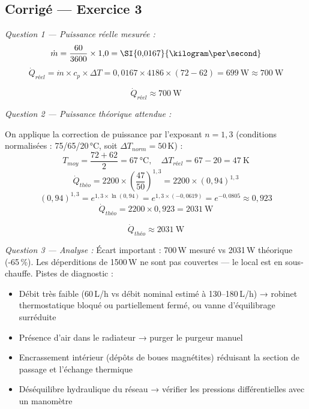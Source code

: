 
\subsection*{Corrigé — Exercice 3}

\textit{Question 1 — Puissance réelle mesurée :}
\[
  \dot{m} = \frac{60}{3600} \times 1{,}0 = \SI{0{,}0167}{\kilogram\per\second}
\]
\[
  \dot{Q}_{réel} = \dot{m} \times c_p \times \Delta T = 0{,}0167 \times 4186 \times (72 - 62) = \SI{699}{\watt} \approx \SI{700}{\watt}
\]

\[
  \boxed{\dot{Q}_{réel} \approx \SI{700}{\watt}}
\]

\textit{Question 2 — Puissance théorique attendue :}

On applique la correction de puissance par l'exposant $n = 1{,}3$ (conditions normalisées : 75/65/20\,°C, soit $\Delta T_{norm} = 50$\,K) :
\[
  T_{moy} = \frac{72 + 62}{2} = \SI{67}{\celsius}, \quad \Delta T_{réel} = 67 - 20 = \SI{47}{\kelvin}
\]
\[
  \dot{Q}_{théo} = 2200 \times \left(\frac{47}{50}\right)^{1{,}3} = 2200 \times (0{,}94)^{1{,}3}
\]
\[
  (0{,}94)^{1{,}3} = e^{1{,}3 \times \ln(0{,}94)} = e^{1{,}3 \times (-0{,}0619)} = e^{-0{,}0805} \approx 0{,}923
\]
\[
  \dot{Q}_{théo} = 2200 \times 0{,}923 = \SI{2031}{\watt}
\]

\[
  \boxed{\dot{Q}_{théo} \approx \SI{2031}{\watt}}
\]

\textit{Question 3 — Analyse :} Écart important : 700\,W mesuré vs 2031\,W théorique (-65\,\%). Les déperditions de 1500\,W ne sont pas couvertes — le local est en sous-chauffe. Pistes de diagnostic :
\begin{itemize}
  \item Débit très faible (60\,L/h vs débit nominal estimé à 130–180\,L/h) → robinet thermostatique bloqué ou partiellement fermé, ou vanne d'équilibrage surréduite
  \item Présence d'air dans le radiateur → purger le purgeur manuel
  \item Encrassement intérieur (dépôts de boues magnétites) réduisant la section de passage et l'échange thermique
  \item Déséquilibre hydraulique du réseau → vérifier les pressions différentielles avec un manomètre
\end{itemize}
